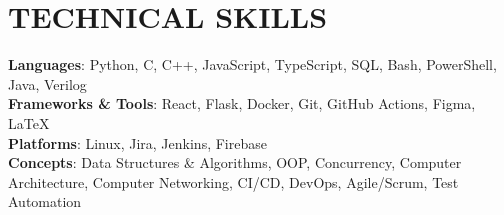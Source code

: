 \section{\textbf {\large TECHNICAL SKILLS}}
    \begin{itemize}[leftmargin=0.15in, label={}]
	\small{\item{
		\textbf{Languages}{: Python, C, C++, JavaScript, TypeScript, SQL, Bash, PowerShell, Java, Verilog} \\
		\textbf{Frameworks \& Tools}{: React, Flask, Docker, Git, GitHub Actions, Figma, LaTeX} \\
		\textbf{Platforms}{: Linux, Jira, Jenkins, Firebase} \\
		\textbf{Concepts}{: Data Structures \& Algorithms, OOP, Concurrency, Computer Architecture, Computer Networking, CI/CD, DevOps, Agile/Scrum, Test Automation}
	}}
    \end{itemize}
